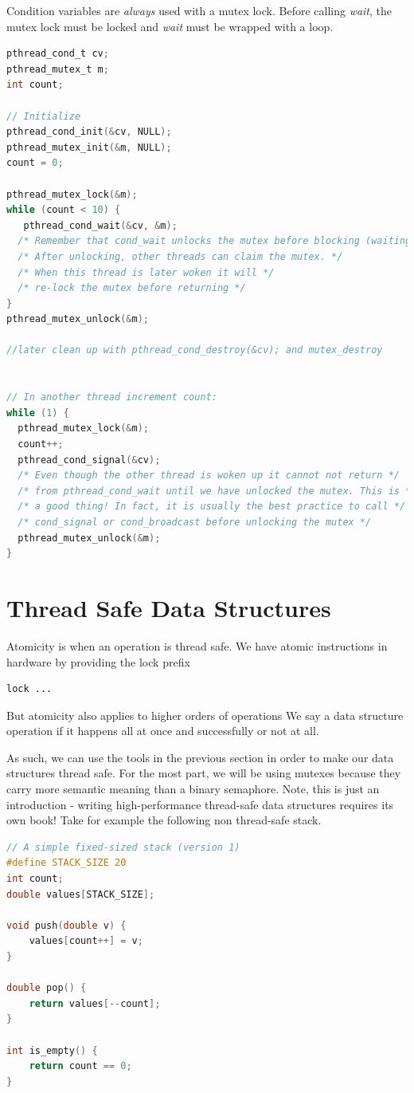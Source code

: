 Condition variables are \emph{always} used with a mutex lock.
Before calling \emph{wait}, the mutex lock must be locked and \emph{wait} must be wrapped with a loop.

\begin{lstlisting}[language=C]
pthread_cond_t cv;
pthread_mutex_t m;
int count;

// Initialize
pthread_cond_init(&cv, NULL);
pthread_mutex_init(&m, NULL);
count = 0;

pthread_mutex_lock(&m);
while (count < 10) {
   pthread_cond_wait(&cv, &m); 
  /* Remember that cond_wait unlocks the mutex before blocking (waiting)! */
  /* After unlocking, other threads can claim the mutex. */
  /* When this thread is later woken it will */
  /* re-lock the mutex before returning */
}
pthread_mutex_unlock(&m);

//later clean up with pthread_cond_destroy(&cv); and mutex_destroy 


// In another thread increment count:
while (1) {
  pthread_mutex_lock(&m);
  count++;
  pthread_cond_signal(&cv);
  /* Even though the other thread is woken up it cannot not return */
  /* from pthread_cond_wait until we have unlocked the mutex. This is */
  /* a good thing! In fact, it is usually the best practice to call */
  /* cond_signal or cond_broadcast before unlocking the mutex */
  pthread_mutex_unlock(&m);
}
\end{lstlisting}

\section{Thread Safe Data Structures}

Atomicity is when an operation is thread safe.
We have atomic instructions in hardware by providing the lock prefix
\begin{lstlisting}
lock ...
\end{lstlisting}
But atomicity also applies to higher orders of operations
We say a data structure operation if it happens all at once and successfully or not at all.

As such, we can use the tools in the previous section in order to make our data structures thread safe.
For the most part, we will be using mutexes because they carry more semantic meaning than a binary semaphore.
Note, this is just an introduction - writing high-performance thread-safe data structures requires its own book!
Take for example the following non thread-safe stack.

\begin{lstlisting}[language=C]
// A simple fixed-sized stack (version 1)
#define STACK_SIZE 20
int count;
double values[STACK_SIZE];

void push(double v) { 
    values[count++] = v; 
}

double pop() {
    return values[--count];
}

int is_empty() {
    return count == 0;
}
\end{lstlisting}

